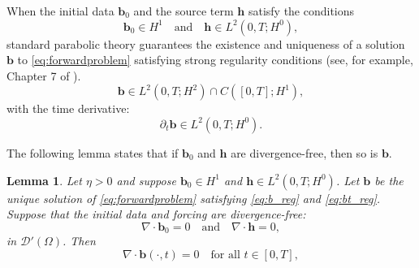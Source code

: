 \documentclass[12pt]{article}
\newtheorem{lemma}{Lemma}
\begin{document}
When the initial data $\boldsymbol{b}_0$ and the source term $\boldsymbol{h}$ satisfy the conditions
$$
\boldsymbol{b}_0 \in H^1 \quad \textrm{and} \quad \boldsymbol{h} \in L^2(0,T;H^0),
$$
standard parabolic theory guarantees the existence and uniqueness of a solution $\boldsymbol{b}$ to \eqref{eq:forwardproblem} satisfying strong regularity conditions (see, for example, Chapter 7 of \cite{evans2022partial}).
\begin{equation}
\boldsymbol{b} \in L^2(0,T;H^2) \cap C([0,T];H^1),\label{eq:b_reg}    
\end{equation}
with the time derivative:
\begin{equation}
\partial_t \boldsymbol{b} \in L^2(0,T;H^0).\label{eq:bt_reg}    
\end{equation}




The following lemma states that if $ \boldsymbol{b}_0$ and $ \boldsymbol{h}$ are divergence-free, then so is $\boldsymbol{b}$.


\begin{lemma}\label{lem:fwdproblemdivfree} Let $\eta>0$ and suppose $\boldsymbol{b}_0 \in H^1$ and $\boldsymbol{h} \in L^2(0,T;H^0)$. Let $\boldsymbol{b}$ be  the unique solution of \eqref{eq:forwardproblem} satisfying \eqref{eq:b_reg} and \eqref{eq:bt_reg}. Suppose that the initial data and forcing are divergence-free:
  \[
    \nabla\cdot \boldsymbol{b}_0 = 0
    \quad\textrm{and}\quad
    \nabla\cdot \boldsymbol{h} = 0,
  \]
  in $\mathcal D'(\Omega)$. Then
  \[
    \nabla\cdot \boldsymbol{b}(\cdot,t) = 0
    \quad\textrm{for all } t\in[0,T],
  \]
\end{lemma}
\end{document}
